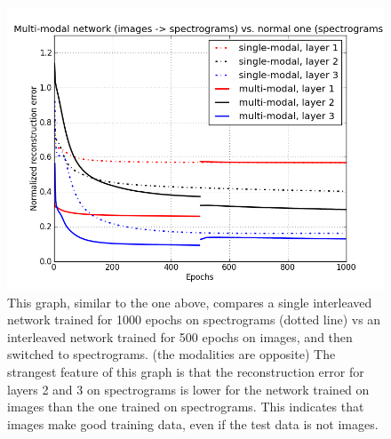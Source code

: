 \documentclass[12pt]{article}
\begin{document}
\begin{doublespacing}
\begin{figure}[p]
\centering
\includegraphics[width=6in]{graph_spect_multi}
\caption{This graph, similar to the one above, compares a single interleaved network trained for 1000 epochs on spectrograms (dotted line) vs an interleaved network trained for 500 epochs on images, and then switched to spectrograms. (the modalities are opposite) The strangest feature of this graph is that the reconstruction error for layers 2 and 3 on spectrograms is lower for the network trained on images than the one trained on spectrograms. This indicates that images make good training data, even if the test data is not images.}
\label{fig:graph_spect_multi}
\end{figure}


\end{doublespacing}
\end{document}
